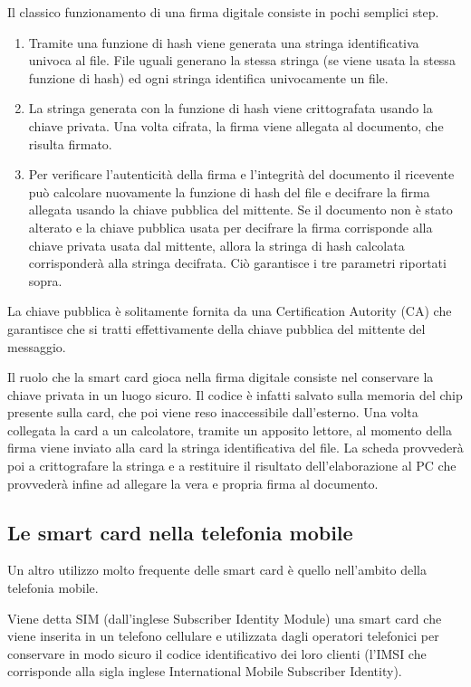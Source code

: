 Il classico funzionamento di una firma digitale consiste in pochi semplici step.
\begin{enumerate}
    \item Tramite una funzione di hash viene generata una stringa identificativa univoca al file. File uguali generano la stessa stringa (se viene usata la stessa funzione di hash) ed ogni stringa identifica univocamente un file.
    \item La stringa generata con la funzione di hash viene crittografata usando la chiave privata. Una volta cifrata, la firma viene allegata al documento, che risulta firmato.
    \item Per verificare l'autenticità della firma e l'integrità del documento il ricevente può calcolare nuovamente la funzione di hash del file e decifrare la firma allegata usando la chiave pubblica del mittente. Se il documento non è stato alterato e la chiave pubblica usata per decifrare la firma corrisponde alla chiave privata usata dal mittente, allora la stringa di hash calcolata corrisponderà alla stringa decifrata. Ciò garantisce i tre parametri riportati sopra.
\end{enumerate}

La chiave pubblica è solitamente fornita da una Certification Autority (CA) che garantisce che si tratti effettivamente della chiave pubblica del mittente del messaggio.

Il ruolo che la smart card gioca nella firma digitale consiste nel conservare la chiave privata in un luogo sicuro. Il codice è infatti salvato sulla memoria del chip presente sulla card, che poi viene reso inaccessibile dall'esterno. Una volta collegata la card a un calcolatore, tramite un apposito lettore, al momento della firma viene inviato alla card la stringa identificativa del file. La scheda provvederà poi a crittografare la stringa e a restituire il risultato dell'elaborazione al PC che provvederà infine ad allegare la vera e propria firma al documento.
\cite{Wiki_fd}

\subsection{Le smart card nella telefonia mobile}
Un altro utilizzo molto frequente delle smart card è quello nell'ambito della telefonia mobile.

Viene detta SIM (dall'inglese Subscriber Identity Module) una smart card che viene inserita in un telefono cellulare e utilizzata dagli operatori telefonici per conservare in modo sicuro il codice identificativo dei loro clienti (l'IMSI che corrisponde alla sigla inglese International Mobile Subscriber Identity).

